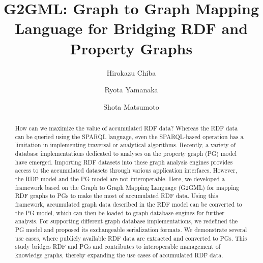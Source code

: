 \documentclass[runningheads]{llncs}
\begin{document}
\newtheorem{defi}[theorem]{Definition}
\newtheorem*{prel}{Preliminaries}
%
\title{G2GML: Graph to Graph Mapping Language for Bridging RDF and Property Graphs} 
%
%
\author{Hirokazu Chiba \and Ryota Yamanaka \and Shota Matsumoto}
%

\setlength\abovecaptionskip{-0.5ex}
%
%
\maketitle
%
\begin{abstract}
How can we maximize the value of accumulated RDF data? Whereas the RDF data can be queried using the SPARQL language, even the SPARQL-based operation has a limitation in implementing traversal or analytical algorithms. Recently, a variety of database implementations dedicated to analyses on the property graph (PG) model have emerged. Importing RDF datasets into these graph analysis engines provides access to the accumulated datasets through various application interfaces. However, the RDF model and the PG model are not interoperable. Here, we developed a framework based on the Graph to Graph Mapping Language (G2GML) for mapping RDF graphs to PGs to make the most of accumulated RDF data. Using this framework, accumulated graph data described in the RDF model can be converted to the PG model, which can then be loaded to graph database engines for further analysis. For supporting different graph database implementations, we redefined the PG model and proposed its exchangeable serialization formats. We demonstrate several use cases, where publicly available RDF data are extracted and converted to PGs. This study bridges RDF and PGs and contributes to interoperable management of knowledge graphs, thereby expanding the use cases of accumulated RDF data.


\end{abstract}
\end{document}
